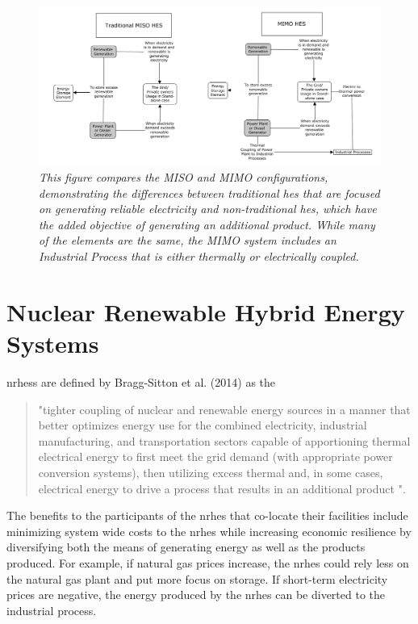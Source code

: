 \begin{figure}
\includegraphics[width=\textwidth]{MISO_MIMO.png}
\caption{\small \sl This figure compares the MISO and MIMO configurations, demonstrating the differences between traditional \ac{hes} that are focused on generating reliable electricity and non-traditional \ac{hes}, which have the added objective of generating an additional product.  While many of the elements are the same, the MIMO system includes an Industrial Process  that is either thermally or electrically coupled.}
\label{MIMO_MISO}
\end{figure}

\section{Nuclear Renewable Hybrid Energy Systems}
\ac{nrhess} are defined by Bragg-Sitton et al. (2014) as the

\begin{quotation}
"tighter coupling of nuclear and renewable energy sources in a manner that better optimizes energy use for the combined electricity, industrial manufacturing, and transportation sectors capable of apportioning thermal electrical energy to first meet the grid demand (with appropriate power conversion systems), then utilizing excess thermal and, in some cases, electrical energy to drive a process that results in an additional product \cite {Bragg-Sitton2014}".
\end{quotation} The benefits to the participants of the \ac{nrhes} that co-locate their facilities include minimizing system wide costs to the \ac{nrhes} while increasing economic resilience by diversifying both the means of generating energy as well as the products produced. For example, if natural gas prices increase, the \ac{nrhes} could rely less on the natural gas plant and put more focus on storage.  If short-term electricity prices are negative, the energy produced by the \ac{nrhes} can be diverted to the industrial process.


